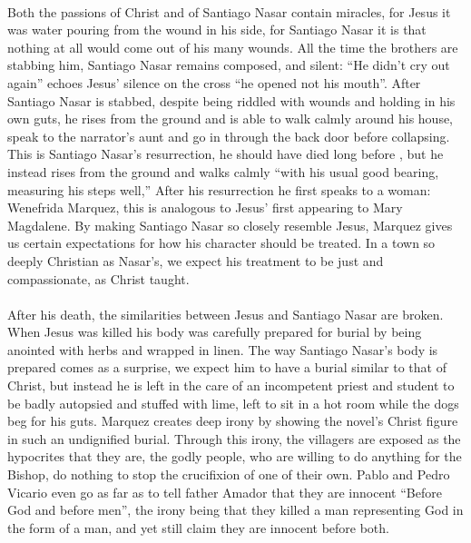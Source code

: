 \documentclass[11pt,a4wide]{article}
\begin{document}
\paragraph{}Both the passions of Christ and of Santiago Nasar contain miracles, 
for Jesus it was water pouring from the wound in his side, for Santiago Nasar it 
is that nothing at all would come out of his many wounds. All the time the 
brothers are stabbing him, Santiago Nasar remains composed, and silent: ``He 
didn't cry out again'' echoes Jesus' silence on the cross ``he opened not his 
mouth''\cite[Isaih 53:7]{bible}. After Santiago Nasar is stabbed, despite being 
riddled with wounds and holding in his own guts, he rises from the ground and
is able to walk calmly around his house,  speak to the narrator's aunt and go
in through the back door before collapsing. This is  Santiago Nasar's 
resurrection, he should have died long before , but he instead rises from the 
ground and walks calmly ``with his usual good bearing, measuring his steps 
well,'' \cite[pg.~120]{chronicle} After his resurrection he first speaks to
a woman: Wenefrida Marquez, this is analogous to Jesus' first appearing to Mary 
Magdalene. By making Santiago Nasar so closely resemble Jesus, Marquez gives us 
certain expectations for how his character should be treated. In a town so 
deeply Christian as Nasar's, we expect his treatment to be just and 
compassionate, as Christ taught.

\paragraph{} After his death, the similarities between Jesus and Santiago Nasar 
are broken. When Jesus was killed his body was carefully prepared for burial by 
being anointed with herbs and wrapped in linen. The way Santiago Nasar's body is 
prepared comes as a surprise, we expect him to have a burial similar to that of 
Christ, but instead he is left in the care of an incompetent priest and student 
to be badly autopsied and stuffed with lime, left to sit in a hot room while the 
dogs beg for his guts. Marquez creates deep irony by showing the novel's Christ 
figure in such an undignified burial. Through this irony, the villagers are 
exposed as the hypocrites that they are, the godly people, who are willing to do 
anything for the Bishop, do nothing to stop the crucifixion of one of their own. 
Pablo and Pedro Vicario even go as far as to tell father Amador that they are 
innocent ``Before God and before men'',  the irony being that they killed a man 
representing God in the form of a man, and yet still claim they are innocent 
before both.  
\end{document}
